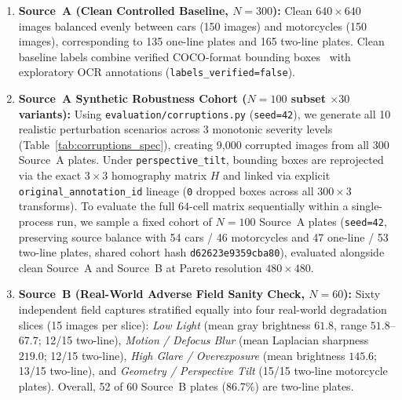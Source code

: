 \documentclass[pdflatex,sn-mathphys-num]{sn-jnl}
\begin{document}
\begin{enumerate}
    \item \textbf{Source~A (Clean Controlled Baseline, $N=300$):} Clean $640\times 640$ images balanced evenly between cars (150 images) and motorcycles (150 images), corresponding to 135 one-line plates and 165 two-line plates. Clean baseline labels combine verified COCO-format bounding boxes~\cite{lin2014coco} with exploratory OCR annotations (\texttt{labels\_verified=false}).
    \item \textbf{Source~A Synthetic Robustness Cohort ($N=100$ subset $\times 30$ variants):} Using \texttt{evaluation/corruptions.py} (\texttt{seed=42}), we generate all 10 realistic perturbation scenarios across 3 monotonic severity levels (Table~\ref{tab:corruptions_spec}), creating 9,000 corrupted images from all 300 Source~A plates. Under \texttt{perspective\_tilt}, bounding boxes are reprojected via the exact $3\times 3$ homography matrix $H$ and linked via explicit \texttt{original\_annotation\_id} lineage (\texttt{0} dropped boxes across all $300\times 3$ transforms). To evaluate the full $64$-cell matrix sequentially within a single-process run, we sample a fixed cohort of $N=100$ Source~A plates (\texttt{seed=42}, preserving source balance with 54 cars / 46 motorcycles and 47 one-line / 53 two-line plates, shared cohort hash \texttt{d62623e9359cba80}), evaluated alongside clean Source~A and Source~B at Pareto resolution $480\times 480$.
    \item \textbf{Source~B (Real-World Adverse Field Sanity Check, $N=60$):} Sixty independent field captures stratified equally into four real-world degradation slices (15 images per slice): \emph{Low Light} (mean gray brightness $61.8$, range $51.8$--$67.7$; 12/15 two-line), \emph{Motion / Defocus Blur} (mean Laplacian sharpness $219.0$; 12/15 two-line), \emph{High Glare / Overexposure} (mean brightness $145.6$; 13/15 two-line), and \emph{Geometry / Perspective Tilt} (15/15 two-line motorcycle plates). Overall, 52 of 60 Source~B plates (86.7\%) are two-line plates.
\end{enumerate}
\end{document}
